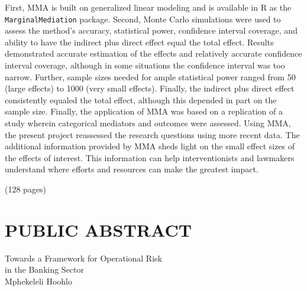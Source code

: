 \documentclass[]{DissertateUSU}
\begin{document}
First, MMA is built on generalized linear modeling and is available in R
as the \texttt{MarginalMediation} package. Second, Monte Carlo
simulations were used to assess the method's accuracy, statistical
power, confidence interval coverage, and ability to have the indirect
plus direct effect equal the total effect. Results demonstrated accurate
estimation of the effects and relatively accurate confidence interval
coverage, although in some situations the confidence interval was too
narrow. Further, sample sizes needed for ample statistical power ranged
from 50 (large effects) to 1000 (very small effects). Finally, the
indirect plus direct effect consistently equaled the total effect,
although this depended in part on the sample size. Finally, the
application of MMA was based on a replication of a study wherein
categorical mediators and outcomes were assessed. Using MMA, the present
project reassessed the research questions using more recent data. The
additional information provided by MMA sheds light on the small effect
sizes of the effects of interest. This information can help
interventionists and lawmakers understand where efforts and resources
can make the greatest impact.

\hspace{11 cm} (128 pages)

\singlespacing

\newpage

 \fancyhead[R]{\thepage} \fancyfoot[C]{}
\chapter*{PUBLIC ABSTRACT}

\doublespacing

\begin{center}
Towards a Framework for Operational Risk \\ 
in the Banking Sector \\
Mphekeleli Hoohlo
\end{center}

\vspace{12pt}
\end{document}
